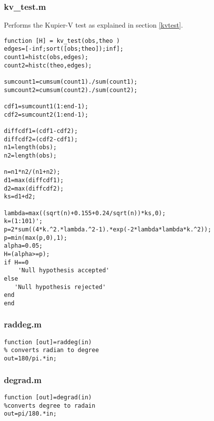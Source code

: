 \subsubsection*{kv\_test.m}
Performs the Kupier-V test as explained in section \ref{kvtest}.
\begin{verbatim}
function [H] = kv_test(obs,theo )
edges=[-inf;sort([obs;theo]);inf];
count1=histc(obs,edges);
count2=histc(theo,edges);

sumcount1=cumsum(count1)./sum(count1);
sumcount2=cumsum(count2)./sum(count2);

cdf1=sumcount1(1:end-1);
cdf2=sumcount2(1:end-1);

diffcdf1=(cdf1-cdf2);
diffcdf2=(cdf2-cdf1);
n1=length(obs);
n2=length(obs);

n=n1*n2/(n1+n2);
d1=max(diffcdf1);
d2=max(diffcdf2);
ks=d1+d2;

lambda=max((sqrt(n)+0.155+0.24/sqrt(n))*ks,0);
k=(1:101)';
p=2*sum((4*k.^2.*lambda.^2-1).*exp(-2*lambda*lambda*k.^2));
p=min(max(p,0),1);
alpha=0.05;
H=(alpha>=p);
if H==0
    'Null hypothesis accepted'
else
   'Null hypothesis rejected'
end
end
\end{verbatim}
\subsubsection*{raddeg.m}
\begin{verbatim}
function [out]=raddeg(in)
% converts radian to degree
out=180/pi.*in;
\end{verbatim}
\subsubsection*{degrad.m}
\begin{verbatim}
function [out]=degrad(in)
%converts degree to radain
out=pi/180.*in;
\end{verbatim}